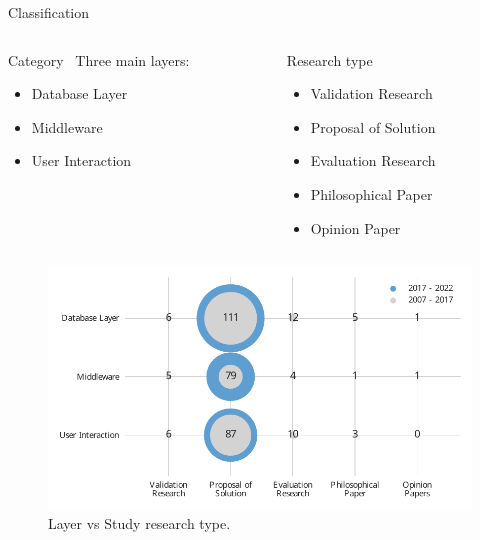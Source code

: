 \documentclass[10pt]{beamer}
\begin{document}
\begin{frame}{Classification}
  \begin{columns}[t, totalwidth=1.02\textwidth]
    \begin{column}{0.45\linewidth}
        \begin{block}{Category~\cite{Idreos2015}}
            Three main layers:
            \begin{itemize}
                \item Database Layer
                \item Middleware
                \item User Interaction
            \end{itemize}
        \end{block}
    \end{column}
    \begin{column}{0.45\linewidth}
        \begin{block}{Research type~\cite{Wieringa2006}}
            \begin{itemize}
                \item Validation Research
                \item Proposal of Solution
                \item Evaluation Research
                \item Philosophical Paper
                \item Opinion Paper
            \end{itemize}
        \end{block}
    \end{column}
    \end{columns}
\end{frame}

\begin{frame}{}
\begin{figure}
    \centering
    \includegraphics[width=\textwidth]{layer_vs_type.pdf}
    \caption{Layer vs Study research type.}
\end{figure}
\end{frame}
\end{document}
